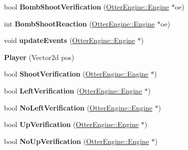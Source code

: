 \begin{DoxyCompactItemize}
\item 
bool {\bfseries Bomb\+Shoot\+Verification} (\hyperlink{class_otter_engine_1_1_engine}{Otter\+Engine\+::\+Engine} $\ast$oe)\hypertarget{class_player_a56aabdfac50ed645ee4a2ae523414b99}{}\label{class_player_a56aabdfac50ed645ee4a2ae523414b99}

\item 
int {\bfseries Bomb\+Shoot\+Reaction} (\hyperlink{class_otter_engine_1_1_engine}{Otter\+Engine\+::\+Engine} $\ast$oe)\hypertarget{class_player_aaaca9914218e56a7d76dc948da704b8b}{}\label{class_player_aaaca9914218e56a7d76dc948da704b8b}

\item 
void {\bfseries update\+Events} (\hyperlink{class_otter_engine_1_1_engine}{Otter\+Engine\+::\+Engine} $\ast$)\hypertarget{class_player_a4c613e5b52cf238bc76826e21f69063a}{}\label{class_player_a4c613e5b52cf238bc76826e21f69063a}

\item 
{\bfseries Player} (Vector2d pos)\hypertarget{class_player_a6afa6b2d6a934f51ca49cb517d611589}{}\label{class_player_a6afa6b2d6a934f51ca49cb517d611589}

\item 
bool {\bfseries Shoot\+Verification} (\hyperlink{class_otter_engine_1_1_engine}{Otter\+Engine\+::\+Engine} $\ast$)\hypertarget{class_player_a41b366758084b559526966a0a287cb80}{}\label{class_player_a41b366758084b559526966a0a287cb80}

\item 
bool {\bfseries Left\+Verification} (\hyperlink{class_otter_engine_1_1_engine}{Otter\+Engine\+::\+Engine} $\ast$)\hypertarget{class_player_a42f77a183fda93b42121766589d82a5a}{}\label{class_player_a42f77a183fda93b42121766589d82a5a}

\item 
bool {\bfseries No\+Left\+Verification} (\hyperlink{class_otter_engine_1_1_engine}{Otter\+Engine\+::\+Engine} $\ast$)\hypertarget{class_player_a1e30e41c16364ab7f99b93a61c6e1e9b}{}\label{class_player_a1e30e41c16364ab7f99b93a61c6e1e9b}

\item 
bool {\bfseries Up\+Verification} (\hyperlink{class_otter_engine_1_1_engine}{Otter\+Engine\+::\+Engine} $\ast$)\hypertarget{class_player_a1f653977a580a6acfb0f192513120eff}{}\label{class_player_a1f653977a580a6acfb0f192513120eff}

\item 
bool {\bfseries No\+Up\+Verification} (\hyperlink{class_otter_engine_1_1_engine}{Otter\+Engine\+::\+Engine} $\ast$)\hypertarget{class_player_ab8ee0574993c3dc692e8f6094dd61c70}{}\label{class_player_ab8ee0574993c3dc692e8f6094dd61c70}


\end{DoxyCompactItemize}
